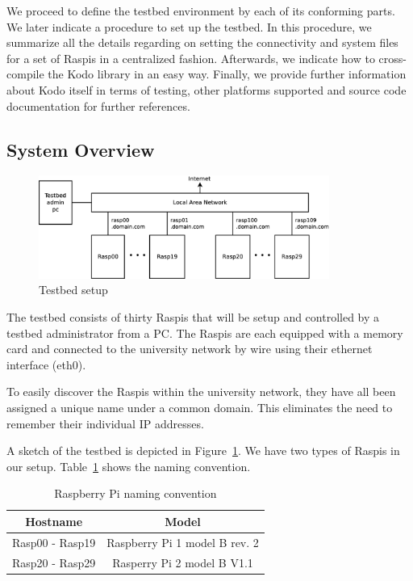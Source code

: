 \label{sec:testbed}

We proceed to define the testbed environment by each of its conforming
parts. We later indicate a procedure to set up the testbed. In this procedure,
we summarize all the details regarding on setting the connectivity and
system files for a set of \ac{Raspi}s in a centralized fashion.
Afterwards, we indicate how to cross-compile the Kodo library in an
easy way. Finally, we provide further information about Kodo itself in terms
of testing, other platforms supported and source code documentation
for further references.

\subsection{System Overview}


\begin{figure}[ht!]
\centering
\includegraphics[width=0.85\textwidth]{images/testbed_setup2.eps}
\caption{Testbed setup}
\label{fig:testbed_setup}
\end{figure}

The testbed consists of thirty \ac{Raspi}s that will be setup and controlled
by a testbed administrator from a \ac{PC}.
The \ac{Raspi}s are each equipped with a memory card and connected to the
university network by wire using their ethernet interface (eth0).

To easily discover the \ac{Raspi}s within the university network,
they have all been assigned a unique name under a common domain.
This eliminates the need to remember their individual \ac{IP} addresses.

A sketch of the testbed is depicted in Figure~\ref{fig:testbed_setup}.
We have two types of \ac{Raspi}s in our setup.
Table~\ref{tab:rasp_naming} shows the naming convention.

\begin{table}[ht!]
  \centering
  \begin{tabular}{|c|c|}
    \hline
      \textbf{Hostname} & \textbf{Model} \\ \hline
    Rasp00 - Rasp19 & Raspberry Pi 1 model B rev. 2 \\ \hline
    Rasp20 - Rasp29 & Rasperry Pi 2 model B V1.1 \\ \hline
  \end{tabular}
  \caption{Raspberry Pi naming convention}
  \label{tab:rasp_naming}
\end{table}




